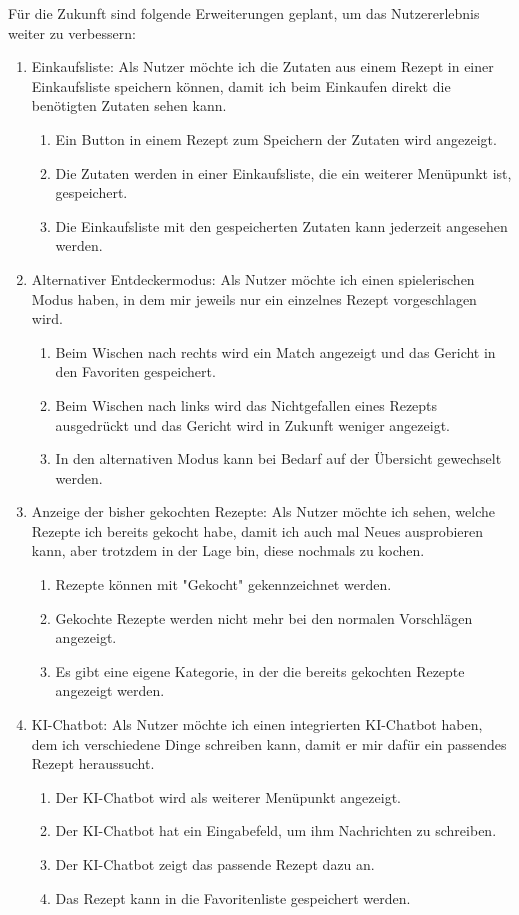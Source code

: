 \documentclass[conference,a4paper,flushend]{cs-techrep}
\begin{document}
Für die Zukunft sind folgende Erweiterungen geplant, um das Nutzererlebnis weiter zu verbessern:
\begin{enumerate}
\item Einkaufsliste: Als Nutzer möchte ich die Zutaten aus einem Rezept in einer Einkaufsliste speichern können, damit ich beim Einkaufen direkt die benötigten Zutaten sehen kann.
\begin{enumerate}
\item  Ein Button in einem Rezept zum Speichern der Zutaten wird angezeigt.
\item  Die Zutaten werden in einer Einkaufsliste, die ein weiterer Menüpunkt ist, gespeichert.
\item  Die Einkaufsliste mit den gespeicherten Zutaten kann jederzeit angesehen werden.
\end{enumerate}

\item Alternativer Entdeckermodus: Als Nutzer möchte ich einen spielerischen Modus haben, in dem mir jeweils nur ein einzelnes Rezept vorgeschlagen wird.
\begin{enumerate}
\item Beim Wischen nach rechts wird ein Match angezeigt und das Gericht in den Favoriten gespeichert.
\item Beim Wischen nach links wird das Nichtgefallen eines Rezepts ausgedrückt und das Gericht wird in Zukunft weniger angezeigt.
\item In den alternativen Modus kann bei Bedarf auf der Übersicht gewechselt werden.
\end{enumerate}

\item Anzeige der bisher gekochten Rezepte: Als Nutzer möchte ich sehen, welche Rezepte ich bereits gekocht habe, damit ich auch mal Neues ausprobieren kann, aber trotzdem in der Lage bin, diese nochmals zu kochen.
\begin{enumerate}
\item Rezepte können mit "Gekocht" gekennzeichnet werden.
\item Gekochte Rezepte werden nicht mehr bei den normalen Vorschlägen angezeigt.
\item Es gibt eine eigene Kategorie, in der die bereits gekochten Rezepte angezeigt werden.
\end{enumerate}


\item KI-Chatbot: Als Nutzer möchte ich einen integrierten KI-Chatbot haben, dem ich verschiedene Dinge schreiben kann, damit er mir dafür ein passendes Rezept heraussucht.
\begin{enumerate}
\item Der KI-Chatbot wird als weiterer Menüpunkt angezeigt.
\item Der KI-Chatbot hat ein Eingabefeld, um ihm Nachrichten zu schreiben.
\item Der KI-Chatbot zeigt das passende Rezept dazu an.
\item Das Rezept kann in die Favoritenliste gespeichert werden.
\end{enumerate}
\end{enumerate}
\end{document}
